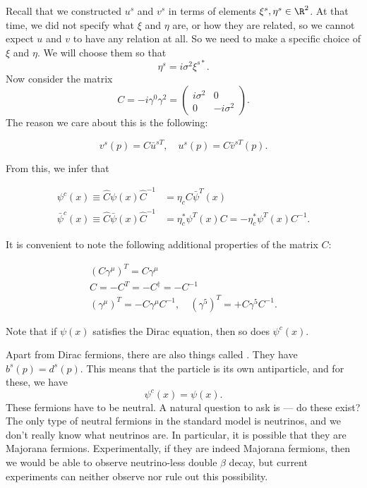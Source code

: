 \documentclass[a4paper]{article}
\begin{document}
Recall that we constructed $u^s$ and $v^s$ in terms of elements $\xi^s, \eta^s \in \R^2$. At that time, we did not specify what $\xi$ and $\eta$ are, or how they are related, so we cannot expect $u$ and $v$ to have any relation at all. So we need to make a specific choice of $\xi$ and $\eta$. We will choose them so that
\[
  \eta^s = i \sigma^2 \xi^{s*}.
\]
Now consider the matrix
\[
  C = -i \gamma^0 \gamma^2 =
  \begin{pmatrix}
    i \sigma^2 & 0\\
    0 & -i \sigma^2
  \end{pmatrix}.
\]
The reason we care about this is the following:
\begin{prop}
  \[
    v^s(p) = C \bar{u}^{sT},\quad u^s(p) = C \bar{v}^{sT}(p).
  \]
\end{prop}
From this, we infer that
\begin{prop}
  \begin{align*}
    \psi^c(x) \equiv \hat{C} \psi(x) \hat{C}^{-1} &= \eta_c C \bar\psi^T (x)\\
    \bar\psi^c(x) \equiv \hat{C} \bar\psi(x) \hat{C}^{-1} &= \eta_c^* \psi^T(x) C = - \eta_c^* \psi^T(x) C^{-1}.
  \end{align*}
\end{prop}
It is convenient to note the following additional properties of the matrix $C$:
\begin{prop}
  \begin{gather*}
    (C \gamma^\mu)^T = C \gamma^\mu\\
    C = -C^T = - C^\dagger = -C^{-1}\\
    (\gamma^\mu)^T = - C \gamma^\mu C^{-1},\quad (\gamma^5)^T = + C \gamma^5 C^{-1}.
  \end{gather*}
\end{prop}
Note that if $\psi(x)$ satisfies the Dirac equation, then so does $\psi^c(x)$.

Apart from Dirac fermions, there are also things called . They have $b^s(p) = d^s(p)$. This means that the particle is its own antiparticle, and for these, we have
\[
  \psi^c(x) = \psi(x).
\]
These fermions have to be neutral. A natural question to ask is --- do these exist? The only type of neutral fermions in the standard model is neutrinos, and we don't really know what neutrinos are. In particular, it is possible that they are Majorana fermions. Experimentally, if they are indeed Majorana fermions, then we would be able to observe neutrino-less double $\beta$ decay, but current experiments can neither observe nor rule out this possibility.
\end{document}
